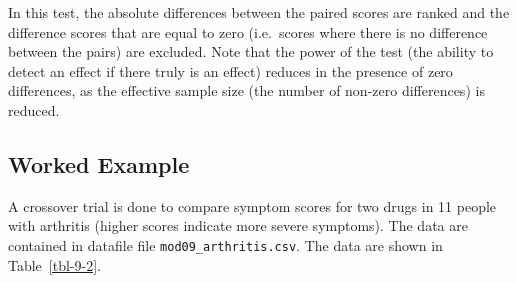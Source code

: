 \documentclass[
  a4paper,
]{memoir}
\begin{document}
In this test, the absolute differences between the paired scores are
ranked and the difference scores that are equal to zero (i.e.~scores
where there is no difference between the pairs) are excluded. Note that
the power of the test (the ability to detect an effect if there truly is
an effect) reduces in the presence of zero differences, as the effective
sample size (the number of non-zero differences) is reduced.

\subsection{Worked Example}\label{worked-example-7}

A crossover trial is done to compare symptom scores for two drugs in 11
people with arthritis (higher scores indicate more severe symptoms). The
data are contained in datafile file \texttt{mod09\_arthritis.csv}. The
data are shown in Table~\ref{tbl-9-2}.

\begin{table}

\caption{\label{tbl-9-2}Arthritis symptom scores for 11 patients after
administering two drugs}


\end{table}%
\end{document}
